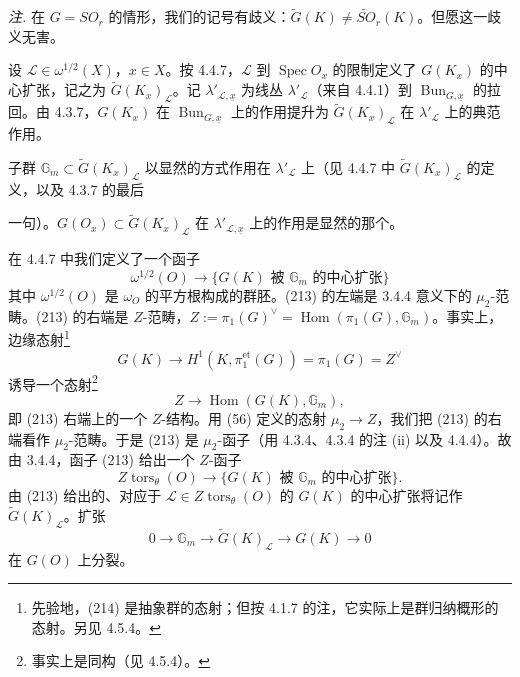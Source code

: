 \emph{注.} 在 $G=SO_{r}$ 的情形，我们的记号有歧义：$\tilde{G}(K)\ne\tilde{SO}_{r}(K)$。但愿这一歧义无害。

 设 $\mathcal{L}\in\omega^{1/2}(X)$，$x\in X$。按 4.4.7，$\mathcal{L}$ 到 $\operatorname{Spec}O_{x}$ 的限制定义了 $G(K_{x})$ 的中心扩张，记之为 $\tilde{G}(K_{x})_{\mathcal{L}}$。记 $\lambda'_{\mathcal{L},\underline{x}}$ 为线丛 $\lambda'_{\mathcal{L}}$（来自 4.4.1）到 $\operatorname{Bun}_{G,\underline{x}}$ 的拉回。由 4.3.7，$G(K_{x})$ 在 $\operatorname{Bun}_{G,\underline{x}}$ 上的作用提升为 $\tilde{G}(K_{x})_{\mathcal{L}}$ 在 $\lambda'_{\mathcal{L}}$ 上的典范作用。

子群 $\mathbb{G}_{m}\subset\tilde{G}(K_{x})_{\mathcal{L}}$ 以显然的方式作用在 $\lambda'_{\mathcal{L}}$ 上（见 4.4.7 中 $\tilde{G}(K_{x})_{\mathcal{L}}$ 的定义，以及 4.3.7 的最后


一句）。$G(O_{x})\subset\tilde{G}(K_{x})_{\mathcal{L}}$ 在 $\lambda'_{\mathcal{L},\underline{x}}$ 上的作用是显然的那个。

 在 4.4.7 中我们定义了一个函子
\begin{equation}\tag{213}
\omega^{1/2}(O)\to\{G(K)\text{ 被 }\mathbb{G}_{m}\text{ 的中心扩张}\}
\end{equation}
其中 $\omega^{1/2}(O)$ 是 $\omega_{O}$ 的平方根构成的群胚。(213) 的左端是 3.4.4 意义下的 $\mu_{2}$-范畴。(213) 的右端是 $Z$-范畴，$Z:=\pi_{1}(G)^{\vee}=\operatorname{Hom}(\pi_{1}(G),\mathbb{G}_{m})$。事实上，边缘态射\footnote{先验地，(214) 是抽象群的态射；但按 4.1.7 的注，它实际上是群归纳概形的态射。另见 4.5.4。}
\begin{equation}\tag{214}
G(K)\to H^{1}(K,\pi_{1}^{\mathrm{et}}(G))=\pi_{1}(G)=Z^{\vee}
\end{equation}
诱导一个态射\footnote{事实上是同构（见 4.5.4）。}
\begin{equation}\tag{215}
Z\to\operatorname{Hom}(G(K),\mathbb{G}_{m}),
\end{equation}
即 (213) 右端上的一个 $Z$-结构。用 (56) 定义的态射 $\mu_{2}\to Z$，我们把 (213) 的右端看作 $\mu_{2}$-范畴。于是 (213) 是 $\mu_{2}$-函子（用 4.3.4、4.3.4 的注 (ii) 以及 4.4.4）。故由 3.4.4，函子 (213) 给出一个 $Z$-函子
\begin{equation}\tag{216}
Z\operatorname{tors}_{\theta}(O)\to\{G(K)\text{ 被 }\mathbb{G}_{m}\text{ 的中心扩张}\}.
\end{equation}
由 (213) 给出的、对应于 $\mathcal{L}\in Z\operatorname{tors}_{\theta}(O)$ 的 $G(K)$ 的中心扩张将记作 $\tilde{G}(K)_{\mathcal{L}}$。扩张
\begin{equation}\tag{217}
0\to\mathbb{G}_{m}\to\tilde{G}(K)_{\mathcal{L}}\to G(K)\to 0
\end{equation}
在 $G(O)$ 上分裂。


